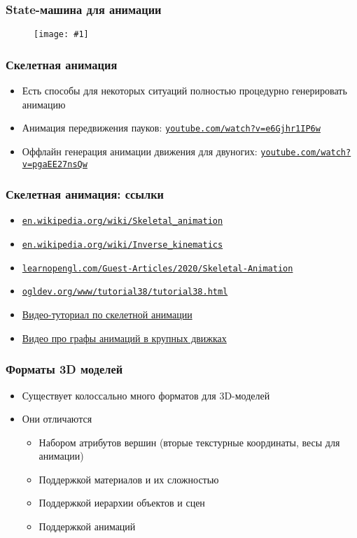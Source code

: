 \documentclass{beamer}
\newcommand{\slideimage}[1]{
  \begin{figure}
    \begin{adjustbox}{width=\textwidth, totalheight=\textheight-2\baselineskip-2\baselineskip,keepaspectratio}
      \texttt{[image: \#1]}
    \end{adjustbox}
  \end{figure}
}
\begin{document}
\begin{frame}[fragile]
\frametitle{State-машина для анимации}
\slideimage{state-machine.png}
\end{frame}

\begin{frame}[fragile]
\frametitle{Скелетная анимация}
\begin{itemize}
\item Есть способы для некоторых ситуаций полностью процедурно генерировать анимацию
\pause
\item Анимация передвижения пауков: \href{https://www.youtube.com/watch?v=e6Gjhr1IP6w}{\nolinkurl{youtube.com/watch?v=e6Gjhr1IP6w}}
\pause
\item Оффлайн генерация анимации движения для двуногих: \href{https://www.youtube.com/watch?v=pgaEE27nsQw}{\nolinkurl{youtube.com/watch?v=pgaEE27nsQw}}
\end{itemize}
\end{frame}

\begin{frame}[fragile]
\frametitle{Скелетная анимация: ссылки}
\begin{itemize}
\item \href{https://en.wikipedia.org/wiki/Skeletal_animation}{\nolinkurl{en.wikipedia.org/wiki/Skeletal\_animation}}
\item \href{https://en.wikipedia.org/wiki/Inverse_kinematics}{\nolinkurl{en.wikipedia.org/wiki/Inverse_kinematics}}
\item \href{https://learnopengl.com/Guest-Articles/2020/Skeletal-Animation}{\nolinkurl{learnopengl.com/Guest-Articles/2020/Skeletal-Animation}}
\item \href{https://ogldev.org/www/tutorial38/tutorial38.html}{\nolinkurl{ogldev.org/www/tutorial38/tutorial38.html}}
\item \href{https://www.youtube.com/watch?v=f3Cr8Yx3GGA}{Видео-туториал по скелетной анимации}
\item \href{https://www.youtube.com/watch?v=R-T3Mk5oDHI}{Видео про графы анимаций в крупных движках}
\end{itemize}
\end{frame}

\begin{frame}[fragile]
\frametitle{Форматы 3D моделей}
\begin{itemize}
\item Существует колоссально много форматов для 3D-моделей
\pause
\item Они отличаются
\pause
\begin{itemize}
\item Набором атрибутов вершин (вторые текстурные координаты, весы для анимации)
\pause
\item Поддержкой материалов и их сложностью
\pause
\item Поддержкой иерархии объектов и сцен
\pause
\item Поддержкой анимаций
\end{itemize}
\end{itemize}
\end{frame}
\end{document}
